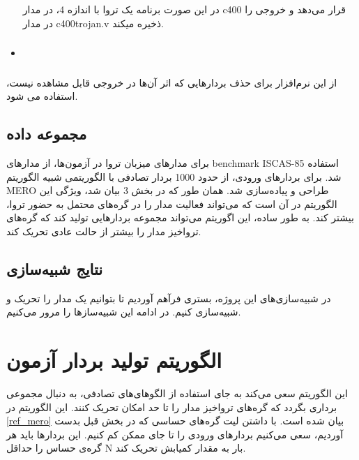 \begin{itemize}
\begin{center}
		
	\end{center}
	در این صورت برنامه یک تروا با اندازه 4، در مدار c400 قرار می‌دهد و خروجی را در مدار c400trojan.v ذخیره میکند.
	\item \subsubsection{}
	
\end{itemize}
از این نرم‌افزار برای حذف بردارهایی که اثر آن‌ها در خروجی قابل مشاهده نیست، استفاده می شود.

\subsection{مجموعه ‌داده}
برای مدارهای میزبان تروا در آزمون‌ها، از مدارهای benchmark ISCAS-85 استفاده شد. 
برای بردارهای ورودی، از حدود 1000 بردار تصادفی با الگوریتمی شبیه الگوریتم MERO طراحی و پیاده‌سازی شد. همان طور که در بخش 3 بیان شد، ویژگی این الگوریتم در آن است که می‌تواند فعالیت مدار را در گره‌های محتمل به حضور تروا، بیشتر کند. به طور ساده، این اگوریتم می‌تواند مجموعه بردارهایی تولید کند که گره‌های تروا‌خیز مدار را بیشتر از حالت عادی تحریک کند.

\subsection{نتایج شبیه‌سازی}
در شبیه‌سازی‌ها‌‌ی این پروژه، بستری فرآهم آوردیم تا بتوانیم یک مدار را تحریک و شبیه‌سازی کنیم. در ادامه این شبیه‌سازها را مرور می‌کنیم.
\section{الگوریتم تولید بردار آزمون} 
این الگوریتم سعی می‌کند به جای استفاده از الگوهای‌های تصادفی، به دنبال مجموعی برداری بگردد که گره‌های تروا‌خیز مدار را تا حد امکان تحریک کنند.  این الگوریتم در \ref{ref_mero} بیان شده است. با داشتن لیت گره‌های حساسی که در بخش قبل بدست آوردیم، سعی می‌کنیم بردارهای ورودی را تا جای ممکن کم کنیم. این بردارها باید هر گره‌ی حساس را حداقل N بار به مقدار کمیابش تحریک کند.\\


